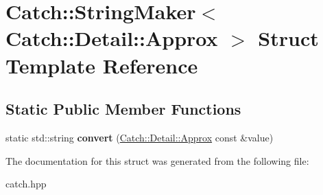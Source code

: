 \hypertarget{structCatch_1_1StringMaker_3_01Catch_1_1Detail_1_1Approx_01_4}{}\section{Catch\+::String\+Maker$<$ Catch\+::Detail\+::Approx $>$ Struct Template Reference}
\label{structCatch_1_1StringMaker_3_01Catch_1_1Detail_1_1Approx_01_4}
\subsection*{Static Public Member Functions}
\begin{DoxyCompactItemize}
\item 
\mbox{\label{structCatch_1_1StringMaker_3_01Catch_1_1Detail_1_1Approx_01_4_a8e5015720682fecfbff0f05de19a698f}} 
static std\+::string {\bfseries convert} (\mbox{\hyperlink{classCatch_1_1Detail_1_1Approx}{Catch\+::\+Detail\+::\+Approx}} const \&value)
\end{DoxyCompactItemize}


The documentation for this struct was generated from the following file\+:\begin{DoxyCompactItemize}
\item 
catch.\+hpp\end{DoxyCompactItemize}

